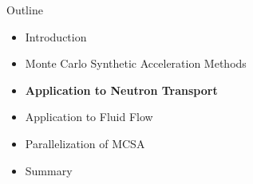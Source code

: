 \documentclass{beamer}
\begin{document}
\begin{frame}{Outline}

  \begin{itemize}
  \item Introduction
    \bigskip
  \item Monte Carlo Synthetic Acceleration Methods
    \bigskip
  \item \textbf{Application to Neutron Transport}
    \bigskip
  \item Application to Fluid Flow
    \bigskip
  \item Parallelization of MCSA
    \bigskip
  \item Summary
  \end{itemize}

\end{frame}
\end{document}
